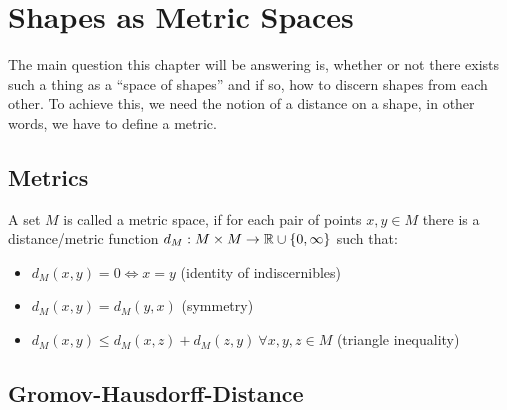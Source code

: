 \chapter{Shapes as Metric Spaces}
\label{chapter:shapeSpaces}
The main question this chapter will be answering is, whether or not there exists such a thing as a ``space of shapes'' and if so, how to discern shapes from each other.
To achieve this, we need the notion of a distance on a shape, in other words, we have to define a metric.

\section{Metrics}
\begin{mydef}
	A set $M$ is called a metric space, if for each pair of points $x,y \in M$ there is a distance/metric function $d_M: M \times M \rightarrow \mathbb{R} \cup \{0,\infty\}$ such that:
	\begin{itemize}
		\item $d_M(x,y) = 0 \Leftrightarrow x = y$ (identity of indiscernibles)
		\item $d_M(x,y) = d_M(y,x)$ (symmetry)
		\item $d_M(x,y) \le d_M(x,z) + d_M(z,y)\ \forall x,y,z \in M$ (triangle inequality)
	\end{itemize}
\end{mydef}


\section{Gromov-Hausdorff-Distance}

